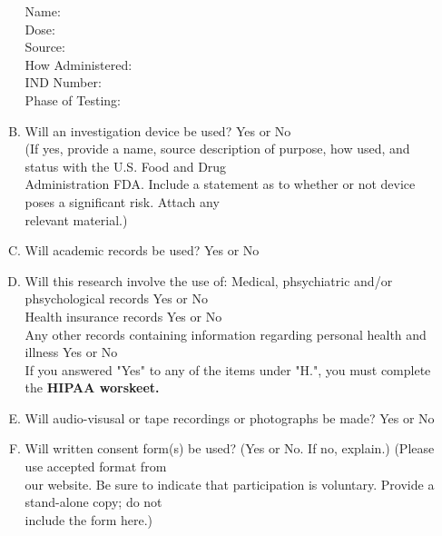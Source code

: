 \documentclass{article}
\begin{document}
\begin{enumerate}[I.]
\begin{enumerate}[A.]
        Name:\\
        Dose: \\
        Source: \\
        How Administered: \\
        IND Number: \\
        Phase of Testing: \\

        \item Will an investigation device be used? Yes or No \\
        (If yes, provide a name, source description of purpose, how used, and status with the U.S. Food and Drug \\
        Administration FDA. Include a statement as to whether or not device poses a significant risk. Attach any \\
        relevant material.)
        
        \item Will academic records be used? Yes or No
        
        \item Will this research involve the use of: 
        Medical, phsychiatric and/or phsychological records Yes or No \\
        Health insurance records Yes or No \\
        Any other records containing information regarding personal health and illness Yes or No \\

        If you answered "Yes" to any of the items under "H.", you must complete the \textbf{HIPAA worskeet.}\\

        \item Will audio-visusal or tape recordings or photographs be made? Yes or No 
        
        \item Will written consent form(s) be used? (Yes or No. If no, explain.) (Please use accepted format from \\
        our website. Be sure to indicate that participation is voluntary. Provide a stand-alone copy; do not \\
        include the form here.)




        
        
    \end{enumerate}
\end{enumerate}
\end{document}
